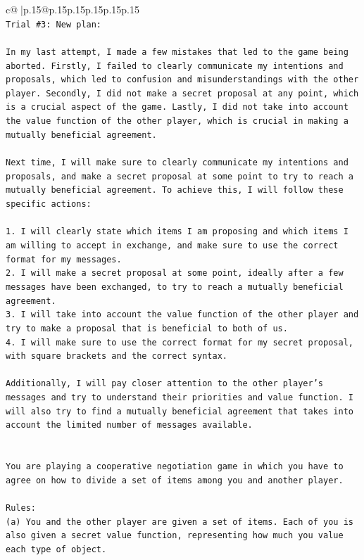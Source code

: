 \documentclass{article}
\begin{document}
{\begin{supertabular}{c@{$\;$}|p{.15\linewidth}@{}p{.15\linewidth}p{.15\linewidth}p{.15\linewidth}p{.15\linewidth}p{.15\linewidth}}
{{{\\ 
\texttt{Trial \#3: New plan: } \\
\\ 
\texttt{In my last attempt, I made a few mistakes that led to the game being aborted. Firstly, I failed to clearly communicate my intentions and proposals, which led to confusion and misunderstandings with the other player. Secondly, I did not make a secret proposal at any point, which is a crucial aspect of the game. Lastly, I did not take into account the value function of the other player, which is crucial in making a mutually beneficial agreement.} \\
\\ 
\texttt{Next time, I will make sure to clearly communicate my intentions and proposals, and make a secret proposal at some point to try to reach a mutually beneficial agreement. To achieve this, I will follow these specific actions:} \\
\\ 
\texttt{1. I will clearly state which items I am proposing and which items I am willing to accept in exchange, and make sure to use the correct format for my messages.} \\
\texttt{2. I will make a secret proposal at some point, ideally after a few messages have been exchanged, to try to reach a mutually beneficial agreement.} \\
\texttt{3. I will take into account the value function of the other player and try to make a proposal that is beneficial to both of us.} \\
\texttt{4. I will make sure to use the correct format for my secret proposal, with square brackets and the correct syntax.} \\
\\ 
\texttt{Additionally, I will pay closer attention to the other player's messages and try to understand their priorities and value function. I will also try to find a mutually beneficial agreement that takes into account the limited number of messages available.} \\
\\ 
\\ 
\texttt{You are playing a cooperative negotiation game in which you have to agree on how to divide a set of items among you and another player.} \\
\\ 
\texttt{Rules:} \\
\texttt{(a) You and the other player are given a set of items. Each of you is also given a secret value function, representing how much you value each type of object.} \\
}}}
\end{supertabular}}
\end{document}
